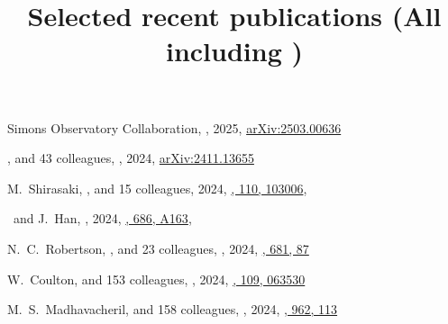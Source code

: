 \title{Selected recent publications {\small (All including \myself)}}


\noindent



\begin{etaremune}

\item
Simons Observatory Collaboration,
,
2025, \href{https://ui.adsabs.harvard.edu/abs/2025arXiv250300636A}{arXiv:2503.00636}
\submitted{\jcap}
    
\item
\myself, and 43 colleagues,
,
2024, \href{https://ui.adsabs.harvard.edu/abs/2024arXiv241113655S/abstract}{arXiv:2411.13655}
\submitted{\aap}

\item
M.~Shirasaki, \myself, and 15 colleagues,
2024, \href{https://ui.adsabs.harvard.edu/abs/2024arXiv240708201S/abstract}{\prd, 110, 103006},

\item
\myself\ and J.~Han,
,
2024, \href{https://ui.adsabs.harvard.edu/abs/2024A&A...686A.163S/abstract}{\aap, 686, A163},
   
\item
N.~C.~Robertson, \myself, and 23 colleagues,
,
2024, \href{https://ui.adsabs.harvard.edu/abs/2024A&A...681A..87R/abstract}{\aap, 681, 87}

\item
W.~Coulton, and 153 colleagues,
,
2024, \href{https://ui.adsabs.harvard.edu/abs/2024PhRvD.109f3530C}{\prd, 109, 063530}

\item
M.~S.~Madhavacheril, and 158 colleagues,
,
2024, \href{https://ui.adsabs.harvard.edu/abs/2024ApJ...962..113M}{\apj, 962, 113}


\end{etaremune}
